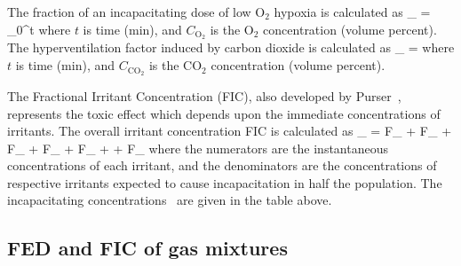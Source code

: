 \documentclass[11pt]{book}
\begin{document}
The fraction of an incapacitating dose of low O${}_2$ hypoxia is calculated as
\be
{}_ =  \int_0^t 
\ee
where $t$ is time (min), and $C_\mathrm{O_2}$ is the O${}_2$ concentration (volume percent).
The hyperventilation factor induced by carbon dioxide is calculated as
\be
{}_ =  \label{co2hyp2}
\ee
where $t$ is time (min), and $C_\mathrm{CO_2}$ is the CO${}_2$ concentration (volume percent).

The Fractional Irritant Concentration (FIC), also developed by Purser~\cite{SFPE:Purser}, represents the toxic effect which
depends upon the immediate concentrations of irritants. The overall irritant concentration FIC is calculated as
\be
{}_ =
        {F_} +
        {F_} +
         {F_} +
       {F_} +
       {F_} +
     +
      {F_}
\ee
where the numerators are the instantaneous concentrations of each irritant, and the denominators are the concentrations of respective irritants
expected to cause incapacitation in half the population. The incapacitating concentrations~\cite{SFPE:Purser} are given in the table above.

\subsection{FED and FIC of gas mixtures}
\label{FED_FIC}
\label{FED_FIC_SMIX}
\end{document}
